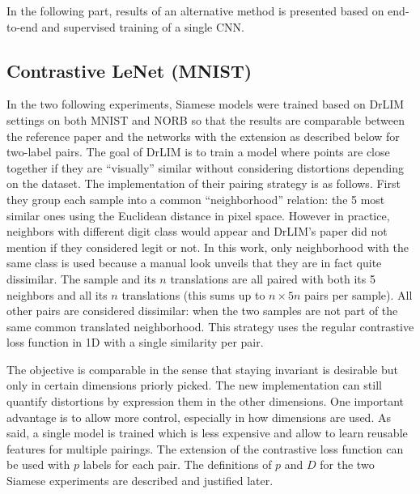 \documentclass[a4paper,12pt]{report}
\begin{document}
In the following part, results of an alternative method is presented based on end-to-end and supervised training of a single CNN.

\subsection{Contrastive LeNet (MNIST)}
In the two following experiments, Siamese models were trained based on DrLIM settings on both MNIST and NORB so that the results are comparable between the reference paper and the networks with the extension as described below for two-label pairs.
The goal of DrLIM is to train a model where points are close together if they are ``visually'' similar without considering distortions depending on the dataset.
The implementation of their pairing strategy is as follows.
First they group each sample into a common ``neighborhood'' relation: the 5 most similar ones using the Euclidean distance in pixel space.
However in practice, neighbors with different digit class would appear and DrLIM's paper did not mention if they considered legit or not.
In this work, only neighborhood with the same class is used because a manual look unveils that they are in fact quite dissimilar.
The sample and its $n$ translations are all paired with both its 5 neighbors and all its $n$ translations (this sums up to $n \times 5n$ pairs per sample).
All other pairs are considered dissimilar: when the two samples are not part of the same common translated neighborhood.
This strategy uses the regular contrastive loss function in 1D with a single similarity per pair.

The objective is comparable in the sense that staying invariant is desirable but only in certain dimensions priorly picked.
The new implementation can still quantify distortions by expression them in the other dimensions.
One important advantage is to allow more control, especially in how dimensions are used.
As said, a single model is trained which is less expensive and allow to learn reusable features for multiple pairings.
The extension of the contrastive loss function can be used with $p$ labels for each pair.
The definitions of $p$ and $D$ for the two Siamese experiments are described and justified later.
\end{document}
